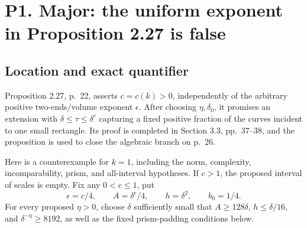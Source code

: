 \documentclass[10pt]{article}
\begin{document}
\section*{P1. Major: the uniform exponent in Proposition 2.27 is false}
\subsection*{Location and exact quantifier}
Proposition 2.27, p. 22, asserts \(c=c(k)>0\), independently of the arbitrary positive two-ends/volume exponent \(\epsilon\). After choosing \(\eta,\delta_0\), it promises an extension with \(\delta\le\tau\le\delta^c\) capturing a fixed positive fraction of the curves incident to one small rectangle. Its proof is completed in Section 3.3, pp. 37–38, and the proposition is used to close the algebraic branch on p. 26.\par
Here is a counterexample for \(k=1\), including the norm, complexity, incomparability, prism, and all-interval hypotheses. If \(c>1\), the proposed interval of scales is empty. Fix any \(0<c\le1\), put \[\epsilon=c/4,\qquad A=\delta^\epsilon/4,\qquad
 h=\delta^2,\qquad b_0=1/4.\] For every proposed \(\eta>0\), choose \(\delta\) sufficiently small that \(A\ge128\delta\), \(h\le\delta/16\), and \(\delta^{-\eta}\ge8192\), as well as the fixed prism-padding conditions below.\par
\end{document}
